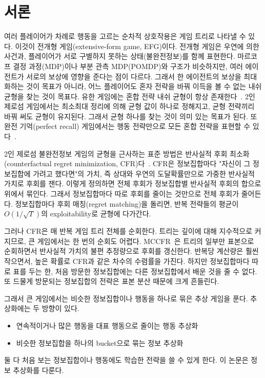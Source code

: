 \section{서론}\label{sec:intro}

여러 플레이어가 차례로 행동을 고르는 순차적 상호작용은 게임 트리로 나타낼 수 있다. 이것이 전개형 게임(extensive-form game, EFG)이다.
전개형 게임은 우연에 의한 사건과, 플레이어가 서로 구별하지 못하는 상태(불완전정보)를 함께 표현한다.
마르코프 결정 과정(MDP)이나 부분 관측 MDP(POMDP)와 구조가 비슷하지만, 여러 에이전트가 서로의 보상에 영향을 준다는 점이 다르다.
그래서 한 에이전트의 보상을 최대화하는 것이 목표가 아니라, 어느 플레이어도 혼자 전략을 바꿔 이득을 볼 수 없는 내쉬 균형을 찾는 것이 목표다.
유한 게임에는 혼합 전략 내쉬 균형이 항상 존재한다~\citep{nash1951non}.
2인 제로섬 게임에서는 최소최대 정리에 의해 균형 값이 하나로 정해지고, 균형 전략끼리 바꿔 써도 균형이 유지된다. 그래서 균형 하나를 찾는 것이 의미 있는 목표가 된다.
또 완전 기억(perfect recall) 게임에서는 행동 전략만으로 모든 혼합 전략을 표현할 수 있다~\citep{kuhn1953extensive}.

2인 제로섬 불완전정보 게임의 균형을 근사하는 표준 방법은 반사실적 후회 최소화(counterfactual regret minimization, CFR)다~\citep{zinkevich2007regret}.
CFR은 정보집합마다 "자신이 그 정보집합에 가려고 했다면"의 가치, 즉 상대와 우연의 도달확률만으로 가중한 반사실적 가치로 후회를 잰다.
이렇게 정의하면 전체 후회가 정보집합별 반사실적 후회의 합으로 위에서 묶인다. 그래서 정보집합마다 따로 후회를 줄이는 것만으로 전체 후회가 줄어든다.
정보집합마다 후회 매칭(regret matching)을 돌리면, 반복 전략들의 평균이 $O(1/\sqrt T)$의 exploitability로 균형에 다가간다.

그러나 CFR은 매 반복 게임 트리 전체를 순회한다. 트리는 깊이에 대해 지수적으로 커지므로, 큰 게임에서는 한 번의 순회도 어렵다.
MCCFR~\citep{lanctot2009monte}은 트리의 일부만 표본으로 순회하면서 반사실적 가치의 불편 추정량으로 후회를 갱신한다.
반복당 계산량은 훨씬 작으면서, 높은 확률로 CFR과 같은 차수의 수렴률을 가진다.
하지만 정보집합마다 따로 표를 두는 한, 처음 방문한 정보집합에는 다른 정보집합에서 배운 것을 줄 수 없다. 또 드물게 방문되는 정보집합의 전략은 표본 분산 때문에 크게 흔들린다.

그래서 큰 게임에서는 비슷한 정보집합이나 행동을 하나로 묶은 추상 게임을 푼다. 추상화에는 두 방향이 있다.
\begin{itemize}
  \item 연속적이거나 많은 행동을 대표 행동으로 줄이는 행동 추상화
  \item 비슷한 정보집합을 하나의 bucket으로 묶는 정보 추상화
\end{itemize}
둘 다 처음 보는 정보집합이나 행동에도 학습한 전략을 쓸 수 있게 한다. 이 논문은 정보 추상화를 다룬다.

